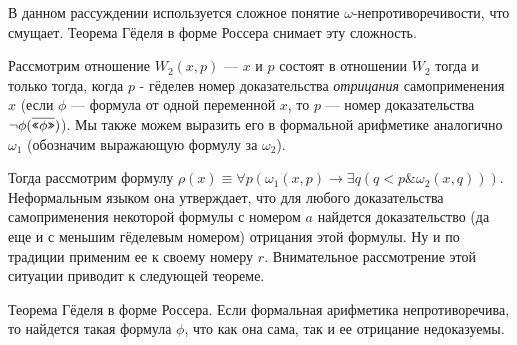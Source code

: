 В данном рассуждении используется сложное понятие
$\omega$-непротиворечивости, что смущает. Теорема Гёделя в форме 
Россера снимает эту сложность.

Рассмотрим отношение $W_2 (x,p)$ --- $x$ и $p$ состоят в отношении $W_2$ тогда и только тогда, когда
$p$ - гёделев номер доказательства \emph{отрицания} самоприменения $x$ (если $\phi$ --- формула от
одной переменной $x$, то $p$ --- номер доказательства $\neg \phi(\overline{\texttt{<<}\phi\texttt{>>}})$). 
Мы также можем выразить его в формальной арифметике аналогично $\omega_1$
(обозначим выражающую формулу за $\omega_2$).

Тогда рассмотрим формулу $\rho(x) \equiv \forall p (\omega_1 (x,p) \rightarrow \exists q (q < p \& \omega_2 (x,q)))$.
Неформальным языком она утверждает, что для любого доказательства самоприменения некоторой 
формулы с номером $a$ найдется доказательство (да еще и с меньшим гёделевым номером) 
отрицания этой формулы. Ну и по традиции применим ее к своему номеру $r$. 
Внимательное рассмотрение этой ситуации приводит к следующей теореме.

\begin{theorem}{Теорема Гёделя в форме Россера.}
Если формальная арифметика непротиворечива, то 
найдется такая формула $\phi$, что как она сама, так и ее отрицание
недоказуемы.
\end{theorem}

